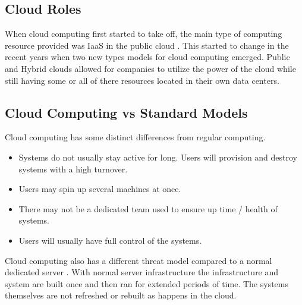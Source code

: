 \documentclass[12pt]{article}
\begin{document}
\subsection{Cloud Roles}
When cloud computing first started to take off, the main type of computing resource provided was IaaS in the public cloud \cite{sourcedigit}. This started to change in the recent years when two new types models for cloud computing emerged. Public and Hybrid clouds allowed for companies to utilize the power of the cloud while still having some or all of there resources located in their own data centers.

\subsection{Cloud Computing vs Standard Models}
Cloud computing has some distinct differences from regular computing.

\begin{itemize}
    \item Systems do not usually stay active for long. Users will provision and destroy systems with a high turnover.
    \item Users may spin up several machines at once.
    \item There may not be a dedicated team used to ensure up time / health of systems.
    \item Users will usually have full control of the systems.
\end{itemize}

Cloud computing also has a different threat model compared to a normal dedicated server \cite{zissis2012addressing, mishra2013cloud, krutz2010cloud}. With normal server infrastructure the infrastructure and system are built once and then ran for extended periods of time. The systems themselves are not refreshed or rebuilt as happens in the cloud.
\end{document}
